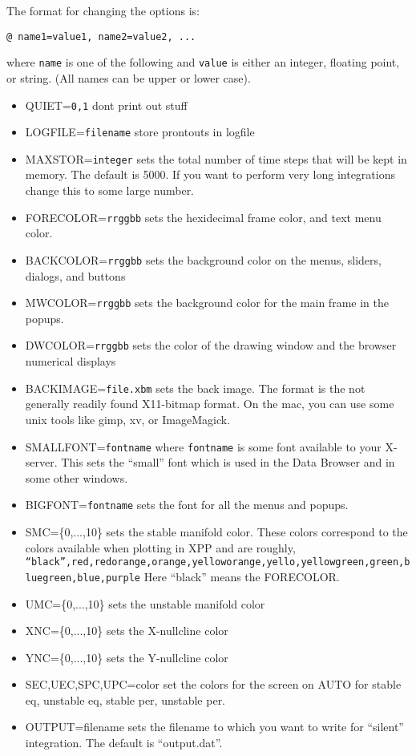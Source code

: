 \medskip

The format for changing the options is:
\begin{verbatim}
@ name1=value1, name2=value2, ...
\end{verbatim}
where {\tt name} is one of the following and {\tt value} is either an
integer, floating point, or string.  (All names can be upper or lower
case). 
\begin{itemize}\itemsep -.05in
\item QUIET={\tt 0,1} dont print out stuff
\item LOGFILE={\tt filename} store prontouts in logfile
\item MAXSTOR={\tt integer} sets the total number of time steps that
will be kept in memory.  The default is 5000.  If you want to perform 
very long integrations change this to some large number.  
\item FORECOLOR={\tt rrggbb} sets the hexidecimal frame color, and text menu color.
\item BACKCOLOR={\tt rrggbb} sets the background color on the menus, sliders, dialogs, and buttons
\item MWCOLOR={\tt rrggbb}  sets the background color for the main frame in the popups.  
\item DWCOLOR={\tt rrggbb} sets the color of the drawing window and the browser numerical displays
\item BACKIMAGE={\tt file.xbm} sets the back image. The format is the not generally readily found X11-bitmap format. On the mac, you can use some unix tools like gimp, xv, or ImageMagick.  
\item SMALLFONT={\tt fontname} where {\tt fontname} is some font available
to your X-server.  This sets the ``small'' font which is used in the
Data Browser and in some other windows.  
\item BIGFONT={\tt fontname} sets the font for all the menus and popups.  
\item SMC=\{0,...,10\} sets the stable manifold color. These colors correspond to the colors available when plotting in XPP and are roughly, {\tt ``black'',red,redorange,orange,yelloworange,yello,yellowgreen,green,bluegreen,blue,purple} Here ``black'' means the FORECOLOR.
\item UMC=\{0,...,10\} sets the unstable manifold color
\item XNC=\{0,...,10\} sets the X-nullcline color
\item YNC=\{0,...,10\} sets the Y-nullcline color
\item SEC,UEC,SPC,UPC=color set the colors for the screen on AUTO for stable eq, unstable eq, stable per, unstable per.
\item OUTPUT=filename sets the filename to which you want to write for
``silent'' integration.  The default is ``output.dat''. 


\end{itemize}

